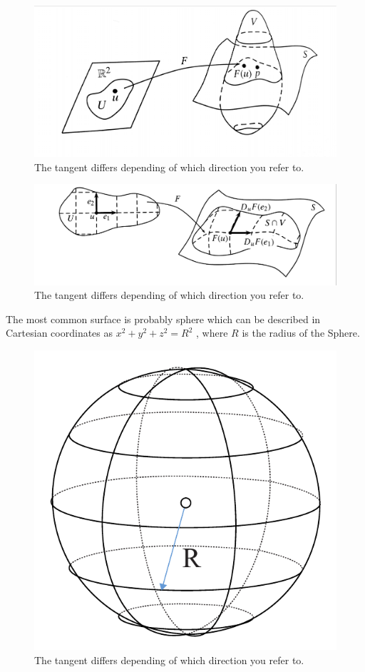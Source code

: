 \begin{figure}[H]
\centering
\includegraphics[width=0.7\linewidth]{figure/Theory/surfdef.pdf}
 
\caption{The tangent differs depending of which direction you refer to. }
\end{figure}


\begin{figure}[H]
\centering
\includegraphics[width=0.8\linewidth]{figure/Theory/surffunction.pdf}
 
\caption{The tangent differs depending of which direction you refer to. }
\end{figure}




The most common surface is probably sphere which can be described in Cartesian coordinates as $ x^2 + y^2 + z^2 = R^2$ , where $R$ is the radius of the Sphere.

\begin{figure}[H]
\centering
\includegraphics[width=0.4\linewidth ]{figure/Theory/sphereEx.pdf}                \caption{The tangent differs depending of which direction you refer to. }
\end{figure}

